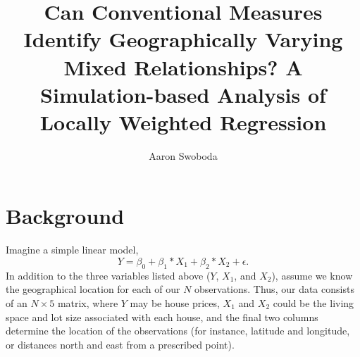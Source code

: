 \documentclass{article}\usepackage[]{graphicx}\usepackage[]{color}
\title{Can Conventional Measures Identify Geographically Varying Mixed Relationships? A Simulation-based Analysis of Locally Weighted Regression}
\author{Aaron Swoboda}
\begin{document}
\maketitle








\section{Background}

Imagine a simple linear model,
\begin{equation}\label{eq:simpleOLS}
Y = \beta _0 + \beta _1 *X_1 + \beta _2 * X_2 + \epsilon .
\end{equation}
In addition to the three variables listed above ($Y$, $X_1$, and $X_2$), assume we know the geographical location for each of our $N$ observations. Thus, our data consists of an $N \times 5$ matrix, where $Y$ may be house prices, $X_1$ and $X_2$ could be the living space and lot size associated with each house, and the final two columns determine the location of the observations (for instance, latitude and longitude, or distances north and east from a prescribed point).
\end{document}
